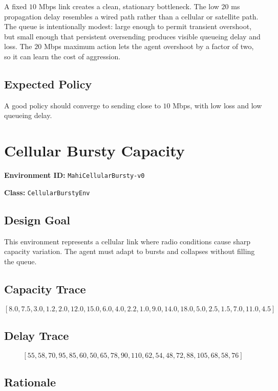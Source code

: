 \documentclass[11pt]{article}
\begin{document}
A fixed \(10\) Mbps link creates a clean, stationary bottleneck. The low
\(20\) ms propagation delay resembles a wired path rather than a cellular or
satellite path. The queue is intentionally modest: large enough to permit
transient overshoot, but small enough that persistent oversending produces
visible queueing delay and loss. The \(20\) Mbps maximum action lets the agent
overshoot by a factor of two, so it can learn the cost of aggression.

\subsection{Expected Policy}

A good policy should converge to sending close to \(10\) Mbps, with low loss and
low queueing delay.

\section{Cellular Bursty Capacity}

\textbf{Environment ID:} \texttt{MahiCellularBursty-v0}

\textbf{Class:} \texttt{CellularBurstyEnv}

\subsection{Design Goal}

This environment represents a cellular link where radio conditions cause sharp
capacity variation. The agent must adapt to bursts and collapses without filling
the queue.

\subsection{Capacity Trace}

\[
[8.0, 7.5, 3.0, 1.2, 2.0, 12.0, 15.0, 6.0, 4.0, 2.2,
1.0, 9.0, 14.0, 18.0, 5.0, 2.5, 1.5, 7.0, 11.0, 4.5]
\]

\subsection{Delay Trace}

\[
[55, 58, 70, 95, 85, 60, 50, 65, 78, 90,
110, 62, 54, 48, 72, 88, 105, 68, 58, 76]
\]

\subsection{Rationale}
\end{document}

